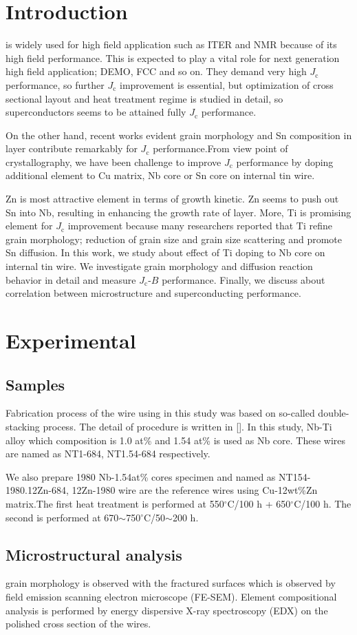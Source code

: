 \documentclass{article}
\begin{document}
\section{Introduction}
 is widely used for high field application such as ITER and NMR because of its high field performance. This is expected to play a vital role for next generation high field application; DEMO, FCC and so on. They demand very high $J_\mathrm{c}$ performance, so further $J_\mathrm{c}$ improvement is essential, but optimization of cross sectional layout and heat treatment regime is studied in detail, so  superconductors seems to be attained fully $J_\mathrm{c}$ performance.

On the other hand, recent works evident grain morphology and Sn composition in  layer contribute remarkably for $J_\mathrm{c}$ performance.From view point of crystallography, we have been challenge to improve $J_\mathrm{c}$ performance by doping additional element to Cu matrix, Nb core or Sn core on  internal tin wire.

Zn is most attractive element in terms of  growth kinetic. Zn seems to push out Sn into Nb, resulting in enhancing the growth rate of  layer. More, Ti is promising element for $J_\mathrm{c}$ improvement because many researchers reported that Ti refine  grain morphology; reduction of grain size and grain size scattering and promote Sn diffusion. In this work, we study about effect of Ti doping to Nb core on  internal tin wire. We investigate  grain morphology and diffusion reaction behavior in detail and measure $J_\mathrm{c}$-$B$ performance. Finally, we discuss about correlation between  microstructure and superconducting performance.

\section{Experimental}
\subsection{Samples}
Fabrication process of the wire using in this study was based on so-called double-stacking process. The detail of procedure is written in []. In this study, Nb-Ti alloy which composition is 1.0 at\% and 1.54 at\% is used as Nb core. These wires are named as NT1-684, NT1.54-684 respectively.

We also prepare 1980 Nb-1.54at\% cores specimen and named as NT154-1980.12Zn-684, 12Zn-1980 wire are the reference wires using Cu-12wt\%Zn matrix.The first heat treatment is performed at 550$^\circ$C/100 h + 650$^\circ$C/100 h. The second is performed at 670$\sim$750$^\circ$C/50$\sim$200 h.

\subsection{Microstructural analysis}
 grain morphology is observed with the fractured surfaces which is observed by field emission scanning electron microscope (FE-SEM). Element compositional analysis is performed by energy dispersive X-ray spectroscopy (EDX) on the polished cross section of the wires.
\end{document}
